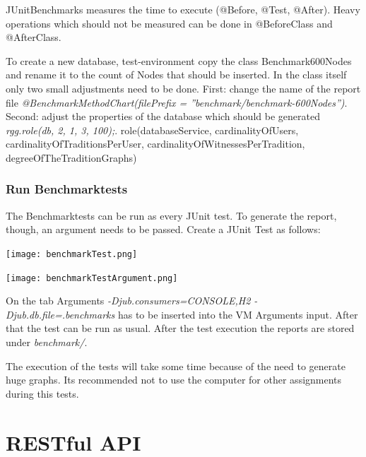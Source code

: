 \documentclass[11pt,fleqn,openany]{book} %
\begin{document}
\begin{remark}
JUnitBenchmarks measures the time to execute (@Before, @Test, @After). Heavy operations which should not be measured can be done in @BeforeClass and @AfterClass.
\end{remark}

To create a new database, test-environment copy the class Benchmark600Nodes and rename it to the count of Nodes that should be inserted. In the class itself only two small adjustments need to be done. First: change the name of the report file \textit{@BenchmarkMethodChart(filePrefix = ''benchmark/benchmark-600Nodes'')}. Second: adjust the properties of the database which should be generated \textit{rgg.role(db, 2, 1, 3, 100);}. role(databaseService, cardinalityOfUsers, cardinalityOfTraditionsPerUser, cardinalityOfWitnessesPerTradition, degreeOfTheTraditionGraphs)

\section*{Run Benchmarktests}
The Benchmarktests can be run as every JUnit test. To generate the report, though, an argument needs to be passed. 
Create a JUnit Test as follows:

\begin{center}
\texttt{[image: benchmarkTest.png]} 
\end{center}

\begin{center}
\texttt{[image: benchmarkTestArgument.png]} 
\end{center}

On the tab Arguments \textit{-Djub.consumers=CONSOLE,H2 -Djub.db.file=.benchmarks} has to be inserted into the VM Arguments input. After that the test can be run as usual. After the test execution the reports are stored under \textit{benchmark/}.
 
\begin{remark}
The execution of the tests will take some time because of the need to generate huge graphs. Its recommended not to use the computer for other assignments during this tests.  
\end{remark}



\part{RESTful API}
\end{document}
